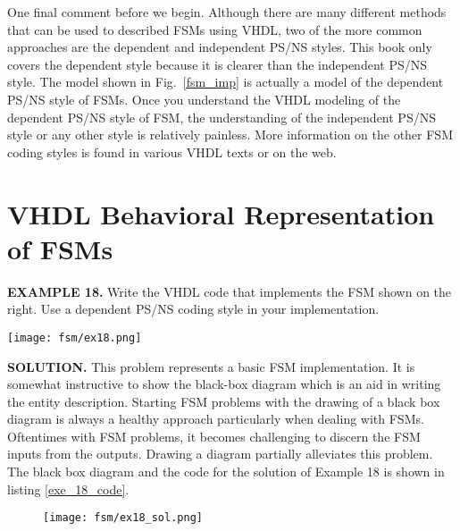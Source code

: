 One final comment before we begin. Although there are many different methods that can be used to described FSMs using VHDL, two of the more common approaches are the dependent and independent PS/NS styles. This book only covers the dependent style because it is clearer than the independent PS/NS style. The model shown in Fig.~\ref{fsm_imp} is actually a model of the dependent PS/NS style of FSMs. Once you understand the VHDL modeling of the dependent PS/NS style of FSM, the understanding of the independent PS/NS style or any other style is relatively painless. More information on the other FSM coding styles is found in various VHDL texts or on the web.

\section{VHDL Behavioral Representation of FSMs}

\begin{leftbar}
\begin{minipage}[t]{0.5\textwidth}
\vspace{10pt}
\noindent
\textbf{EXAMPLE 18.}
Write the VHDL code that implements the FSM shown on the right. Use a dependent PS/NS coding style in your implementation.
\end{minipage}
\begin{minipage}[t]{0.47\textwidth}
\vspace{0pt}\raggedright
    \centering
	\texttt{[image: fsm/ex18.png]}
\end{minipage}
\end{leftbar}
\noindent
\textbf{SOLUTION.} This problem represents a basic FSM implementation. It is somewhat instructive to show the black-box diagram which is an aid in writing the entity description. Starting FSM problems with the drawing of a black box diagram is always a healthy approach particularly when dealing with FSMs. Oftentimes with FSM problems, it becomes challenging to discern the FSM inputs from the outputs. Drawing a diagram partially alleviates this problem. The black box diagram and the code for the solution of Example 18 is shown in listing \ref{exe_18_code}.
\begin{figure}[!h]
    \centering
	\texttt{[image: fsm/ex18\_sol.png]}
\end{figure}

